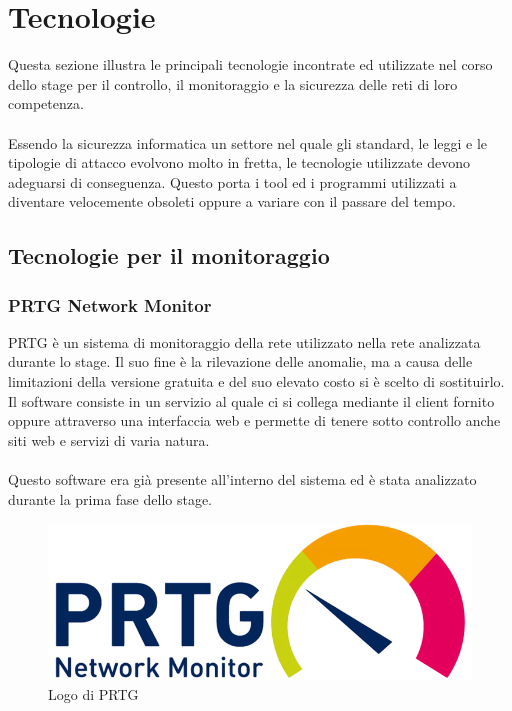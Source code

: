 \documentclass[Tesi.tex]{subfiles}
\begin{document}
\chapter{Tecnologie}

Questa sezione illustra le principali tecnologie incontrate ed utilizzate nel corso dello stage per il controllo, il monitoraggio e la sicurezza delle reti di loro competenza. \\\\
Essendo la sicurezza informatica un settore nel quale gli standard, le leggi e le tipologie di attacco evolvono molto in fretta, le tecnologie utilizzate devono adeguarsi di conseguenza. Questo porta i tool ed i programmi utilizzati a diventare velocemente obsoleti oppure a variare con il passare del tempo.

\section{Tecnologie per il monitoraggio}
\subsection{PRTG Network Monitor}
PRTG è un sistema di monitoraggio della rete utilizzato nella rete analizzata durante lo stage. Il suo fine è la rilevazione delle anomalie, ma a causa delle limitazioni della versione gratuita e del suo elevato costo si è scelto di sostituirlo.\\
Il software consiste in un servizio al quale ci si collega mediante il client fornito oppure attraverso una interfaccia web e permette di tenere sotto controllo anche siti web e servizi di varia natura.\\\\
Questo software era già presente all'interno del sistema ed è stata analizzato durante la prima fase dello stage.
\begin{figure}[H]
	\centering
	\includegraphics[width=0.35\linewidth]{"images/logo/PRTG_logo"}
	\caption{Logo di PRTG}
	\label{fig:Logo di PRTG}
\end{figure}
\end{document}
